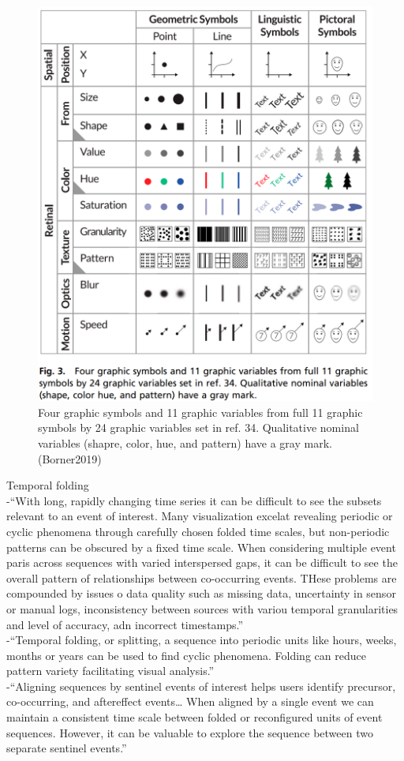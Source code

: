 \begin{figure}[H]
	\centering
	\includegraphics[width=.9\linewidth]{images/borner2019_figure3.png}
	\caption{Four graphic symbols and 11 graphic variables from full 11 graphic symbols by 24 graphic variables set in ref. 34. Qualitative nominal variables (shapre, color, hue, and pattern) have a gray mark. (Borner2019)}
	\label{fig:borner2019_fig3}
\end{figure}

Temporal folding \\

-{\color{orange}“With long, rapidly changing time series it can be difficult to see the subsets relevant to an event of interest. Many visualization excelat revealing periodic or cyclic phenomena through carefully chosen folded time scales, but non-periodic patterns can be obscured by a fixed time scale. When considering multiple event paris across sequences with varied interspersed gaps, it can be difficult to see the overall pattern of relationships between co-occurring events. THese problems are compounded by issues o data quality such as missing data, uncertainty in sensor or manual logs, inconsistency between sources with variou temporal granularities and level of accuracy, adn incorrect timestamps.”\cite{Zhang2019}}\\
-{\color{orange}“Temporal folding, or splitting, a sequence into periodic units like hours, weeks, months or years can be used to find cyclic phenomena. Folding can reduce pattern variety facilitating visual analysis.”\cite{Zhang2019}}\\
-{\color{orange}“Aligning sequences by sentinel events of interest helps users identify precursor, co-occurring, and aftereffect events… When aligned by a single event we can maintain a consistent time scale between folded or reconfigured units of event sequences. However, it can be valuable to explore the sequence between two separate sentinel events.”\cite{Zhang2019}}\\

